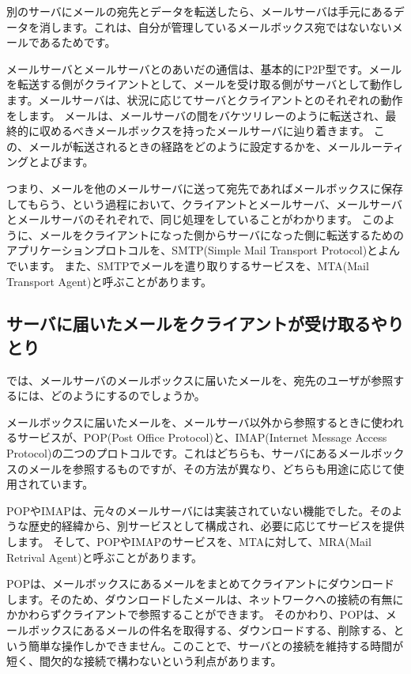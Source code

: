 別のサーバにメールの宛先とデータを転送したら、メールサーバは手元にあるデータを消します。これは、自分が管理しているメールボックス宛ではないないメールであるためです。

メールサーバとメールサーバとのあいだの通信は、基本的にP2P型です。メールを転送する側がクライアントとして、メールを受け取る側がサーバとして動作します。メールサーバは、状況に応じてサーバとクライアントとのそれぞれの動作をします。
メールは、メールサーバの間をバケツリレーのように転送され、最終的に収めるべきメールボックスを持ったメールサーバに辿り着きます。
この、メールが転送されるときの経路をどのように設定するかを、メールルーティングとよびます。

つまり、メールを他のメールサーバに送って宛先であればメールボックスに保存してもらう、という過程において、クライアントとメールサーバ、メールサーバとメールサーバのそれぞれで、同じ処理をしていることがわかります。
このように、メールをクライアントになった側からサーバになった側に転送するためのアプリケーションプロトコルを、SMTP(Simple Mail Transport Protocol)とよんでいます。
また、SMTPでメールを遣り取りするサービスを、MTA(Mail Transport Agent)と呼ぶことがあります。


\subsection{サーバに届いたメールをクライアントが受け取るやりとり}

では、メールサーバのメールボックスに届いたメールを、宛先のユーザが参照するには、どのようにするのでしょうか。

メールボックスに届いたメールを、メールサーバ以外から参照するときに使われるサービスが、POP(Post Office Protocol)と、IMAP(Internet Message Access Protocol)の二つのプロトコルです。これはどちらも、サーバにあるメールボックスのメールを参照するものですが、その方法が異なり、どちらも用途に応じて使用されています。

POPやIMAPは、元々のメールサーバには実装されていない機能でした。そのような歴史的経緯から、別サービスとして構成され、必要に応じてサービスを提供します。
そして、POPやIMAPのサービスを、MTAに対して、MRA(Mail Retrival Agent)と呼ぶことがあります。

POPは、メールボックスにあるメールをまとめてクライアントにダウンロードします。そのため、ダウンロードしたメールは、ネットワークへの接続の有無にかかわらずクライアントで参照することができます。
そのかわり、POPは、メールボックスにあるメールの件名を取得する、ダウンロードする、削除する、という簡単な操作しかできません。このことで、サーバとの接続を維持する時間が短く、間欠的な接続で構わないという利点があります。

